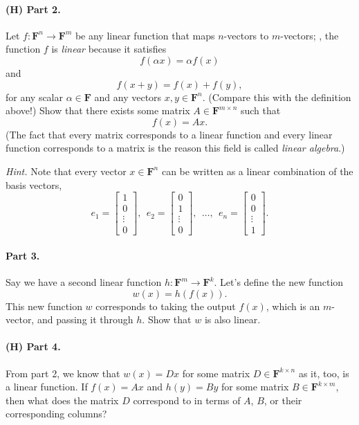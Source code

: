 \documentclass[12pt]{article}
\newcommand{\field}{\mathbf{F}}
\begin{document}
\paragraph{(H) Part 2.} Let $f: \field^n \to \field^m$ be any linear function that maps
$n$-vectors to $m$-vectors;
\ie, the function $f$ is \emph{linear} because it satisfies
\[
    f(\alpha x) = \alpha f(x)
\]
and 
\[
    f(x + y) = f(x) + f(y),
\]
for any scalar $\alpha \in \field$ and any vectors $x, y \in \field^n$.
(Compare this with the definition above!) Show that there exists some matrix $A
\in \field^{m \times n}$ such that
\[
    f(x) = Ax.
\]
(The fact that every matrix corresponds to a linear function and every linear
function corresponds to a matrix is the reason this field is called
\emph{linear algebra}.)

\emph{Hint.} Note that every vector $x \in \field^n$ can be written
as a linear combination of the basis vectors,
\[
    e_1 = \begin{bmatrix}
        1\\0\\\vdots\\0
    \end{bmatrix},
    ~~
    e_2 = 
    \begin{bmatrix}
        0\\1\\\vdots\\0
    \end{bmatrix},
    ~~
    \dots,
    ~~
    e_n = 
    \begin{bmatrix}
        0\\0\\\vdots\\1
    \end{bmatrix}.
\]

\paragraph{Part 3.} Say we have a second linear function $h: \field^m \to
\field^k$. Let's define the new function
\[
    w(x) = h(f(x)).
\]
This new function $w$ corresponds to taking the output $f(x)$, which is an
$m$-vector, and passing it through $h$. Show that $w$ is also linear.

\paragraph{(H) Part 4.} From part 2, we know that $w(x) = Dx$ for some matrix
$D \in \field^{k \times n}$ as it, too, is a linear function. If $f(x) = Ax$
and $h(y) = By$ for some matrix $B \in \field^{k\times m}$, then what does the
matrix $D$ correspond to in terms of $A$, $B$, or their corresponding columns?
\end{document}
